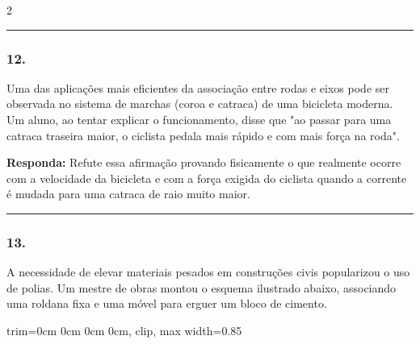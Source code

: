 \documentclass[twoside, 10pt, a4paper]{article}
\newlength{\espacoPreQuestao}\setlength{\espacoPreQuestao}{0.1cm}
\newlength{\espacoQuestao}\setlength{\espacoQuestao}{0.2cm}
\newcommand{\larguraTikz}{0.85\linewidth}
\begin{document}
\begin{multicols*}{2}
\noindent\textcolor{CorLinha}{\rule{\linewidth}{0.5pt}}
\par\vspace{\espacoPreQuestao}
\subsubsection*{12.} Uma das aplicações mais eficientes da associação entre rodas e eixos pode ser observada no sistema de marchas (coroa e catraca) de uma bicicleta moderna. Um aluno, ao tentar explicar o funcionamento, disse que "ao passar para uma catraca traseira maior, o ciclista pedala mais rápido e com mais força na roda".
\begin{boxresponda}
\textbf{Responda:} Refute essa afirmação provando fisicamente o que realmente ocorre com a velocidade da bicicleta e com a força exigida do ciclista quando a corrente é mudada para uma catraca de raio muito maior.
\end{boxresponda}
\par\vspace{\espacoQuestao}
\noindent\textcolor{CorLinha}{\rule{\linewidth}{0.5pt}} 
\par\vspace{\espacoPreQuestao}
\subsubsection*{13.} A necessidade de elevar materiais pesados em construções civis popularizou o uso de polias. Um mestre de obras montou o esquema ilustrado abaixo, associando uma roldana fixa e uma móvel para erguer um bloco de cimento.
\begin{center}
\begin{adjustbox}{trim=0cm 0cm 0cm 0cm, clip, max width=\larguraTikz}
\end{adjustbox}
\end{center}
\end{multicols*}
\end{document}
